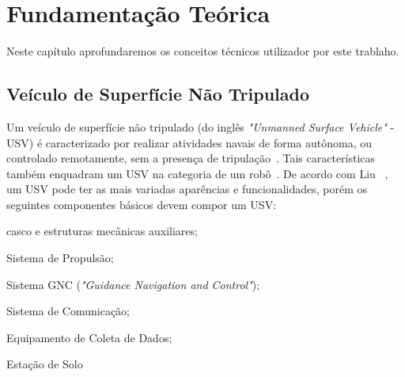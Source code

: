 


\chapter{Fundamentação Teórica}\label{chap2:fund_teo}
    Neste capítulo aprofundaremos os conceitos técnicos utilizador por este trablaho.
    \section{Veículo de Superfície Não Tripulado}\label{subchap2:USV}
        Um veículo de superfície não tripulado (do inglês \textit{"Unmanned Surface Vehicle"} - USV) é caracterizado por realizar atividades navais de forma autônoma, ou controlado remotamente, sem a presença de tripulação~\cite{LIU201671}. Tais características também enquadram um USV na categoria de um robô~\cite{JURAK2020}.
        De acordo com Liu \etal~\cite{LIU201671}, um USV pode ter as mais variadas aparências e funcionalidades, porém os seguintes componentes básicos devem compor um USV: 
        \begin{enumerate*}[label=\alph*)]
            \item casco e estruturas mecânicas auxiliares;
            \item Sistema de Propulsão;
            \item Sistema GNC (\textit{"Guidance Navigation and Control"});
            \item Sistema de Comunicação;
            \item Equipamento de Coleta de Dados;
            \item Estação de Solo
        \end{enumerate*}
        
